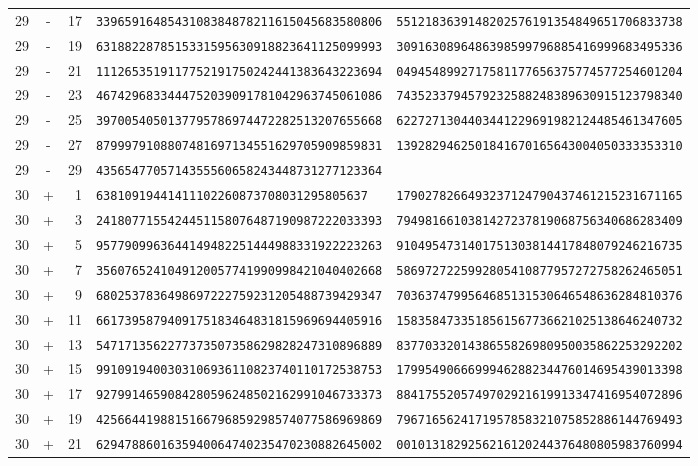 \begin{longtable}{@{}rcrll@{}}
29&-&17&\texttt{3396591648543108384878211615045683580806}&\texttt{5512183639148202576191354849651706833738}\\
29&-&19&\texttt{6318822878515331595630918823641125099993}&\texttt{3091630896486398599796885416999683495336}\\
29&-&21&\texttt{1112653519117752191750242441383643223694}&\texttt{0494548992717581177656375774577254601204}\\
29&-&23&\texttt{4674296833444752039091781042963745061086}&\texttt{7435233794579232588248389630915123798340}\\
29&-&25&\texttt{3970054050137795786974472282513207655668}&\texttt{6227271304403441229691982124485461347605}\\
29&-&27&\texttt{8799979108807481697134551629705909859831}&\texttt{1392829462501841670165643004050333353310}\\
29&-&29&\texttt{4356547705714355560658243448731277123364}&\texttt{}\\
30&+&1&\texttt{63810919441411102260873708031295805637}&\texttt{1790278266493237124790437461215231671165}\\
30&+&3&\texttt{2418077155424451158076487190987222033393}&\texttt{7949816610381427237819068756340686283409}\\
30&+&5&\texttt{9577909963644149482251444988331922223263}&\texttt{9104954731401751303814417848079246216735}\\
30&+&7&\texttt{3560765241049120057741990998421040402668}&\texttt{5869727225992805410877957272758262465051}\\
30&+&9&\texttt{6802537836498697222759231205488739429347}&\texttt{7036374799564685131530646548636284810376}\\
30&+&11&\texttt{6617395879409175183464831815969694405916}&\texttt{1583584733518561567736621025138646240732}\\
30&+&13&\texttt{5471713562277373507358629828247310896889}&\texttt{8377033201438655826980950035862253292202}\\
30&+&15&\texttt{9910919400303106936110823740110172538753}&\texttt{1799549066699946288234476014695439013398}\\
30&+&17&\texttt{9279914659084280596248502162991046733373}&\texttt{8841755205749702921619913347416954072896}\\
30&+&19&\texttt{4256644198815166796859298574077586969869}&\texttt{7967165624171957858321075852886144769493}\\
30&+&21&\texttt{6294788601635940064740235470230882645002}&\texttt{0010131829256216120244376480805983760994}\\

\end{longtable}
